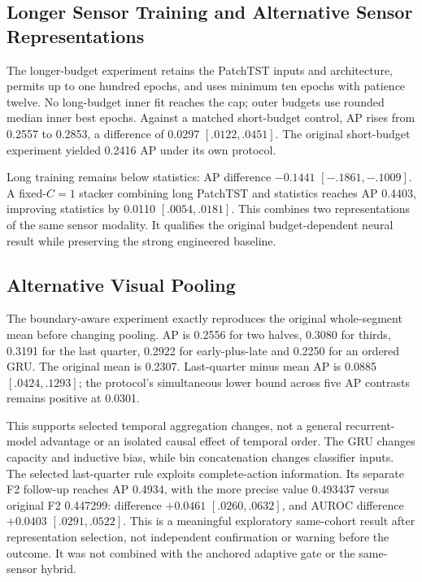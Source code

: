 \subsection{Longer Sensor Training and Alternative Sensor Representations}
The longer-budget experiment retains the PatchTST inputs and architecture, permits up to one hundred epochs, and uses minimum ten epochs with patience twelve. No long-budget inner fit reaches the cap; outer budgets use rounded median inner best epochs. Against a matched short-budget control, AP rises from 0.2557 to 0.2853, a difference of 0.0297 $[.0122,.0451]$. The original short-budget experiment yielded 0.2416 AP under its own protocol.

Long training remains below statistics: AP difference $-0.1441$ $[-.1861,-.1009]$. A fixed-$C=1$ stacker combining long PatchTST and statistics reaches AP 0.4403, improving statistics by 0.0110 $[.0054,.0181]$. This combines two representations of the same sensor modality. It qualifies the original budget-dependent neural result while preserving the strong engineered baseline.

\subsection{Alternative Visual Pooling}
The boundary-aware experiment exactly reproduces the original whole-segment mean before changing pooling. AP is 0.2556 for two halves, 0.3080 for thirds, 0.3191 for the last quarter, 0.2922 for early-plus-late and 0.2250 for an ordered GRU. The original mean is 0.2307. Last-quarter minus mean AP is 0.0885 $[.0424,.1293]$; the protocol's simultaneous lower bound across five AP contrasts remains positive at 0.0301.

This supports selected temporal aggregation changes, not a general recurrent-model advantage or an isolated causal effect of temporal order. The GRU changes capacity and inductive bias, while bin concatenation changes classifier inputs. The selected last-quarter rule exploits complete-action information. Its separate F2 follow-up reaches AP 0.4934, with the more precise value 0.493437 versus original F2 0.447299: difference $+0.0461$ $[.0260,.0632]$, and AUROC difference $+0.0403$ $[.0291,.0522]$. This is a meaningful exploratory same-cohort result after representation selection, not independent confirmation or warning before the outcome. It was not combined with the anchored adaptive gate or the same-sensor hybrid.

